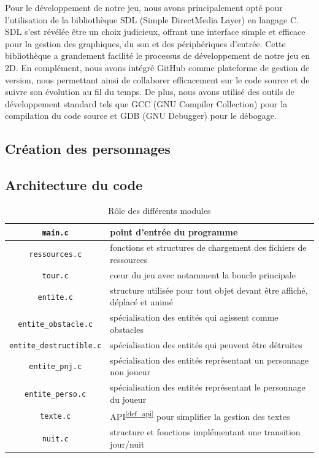\documentclass[a4paper,12pt]{article}
\newcommand\refsuscrite[1]{\textsuperscript{\ref{#1}}}
\begin{document}
Pour le développement de notre jeu, nous avons principalement opté pour l'utilisation de la bibliothèque SDL (Simple DirectMedia Layer) en langage C. SDL s'est révélée être un choix judicieux, offrant une interface simple et efficace pour la gestion des graphiques, du son et des périphériques d'entrée. Cette bibliothèque a grandement facilité le processus de développement de notre jeu en 2D. En complément, nous avons intégré GitHub comme plateforme de gestion de version, nous permettant ainsi de collaborer efficacement sur le code source et de suivre son évolution au fil du temps. De plus, nous avons utilisé des outils de développement standard tels que GCC (GNU Compiler Collection) pour la compilation du code source et GDB (GNU Debugger) pour le débogage.

\subsection{Création des personnages}



\subsection{Architecture du code}

\begin{table}[H]
    \centering
    \begin{tabular}{c p{}}
	\toprule
	\texttt{main.c}			    & point d’entrée du programme	\\
	\midrule
	\texttt{ressources.c}		    & fonctions et structures de chargement des fichiers de ressources	\\
	\midrule
	\texttt{tour.c}			    & cœur du jeu avec notamment la boucle principale	\\
	\midrule
	\texttt{entite.c}                   & structure utilisée pour tout objet devant être affiché, déplacé et animé  \\
	\midrule
	\texttt{entite\_obstacle.c}          & spécialisation des entités qui agissent comme obstacles  \\
	\midrule
	\texttt{entite\_destructible.c}	    & spécialisation des entités qui peuvent être détruites \\
	\midrule
	\texttt{entite\_pnj.c}		    & spécialisation des entités représentant un personnage non joueur	\\
	\midrule
	\texttt{entite\_perso.c}		    & spécialisation des entités représentant le personnage du joueur	\\
	\midrule
	\texttt{texte.c}		    & API\refsuscrite{def_api} pour simplifier la gestion des textes   \\
	\midrule
	\texttt{nuit.c}			    & structure et fonctions implémentant une transition jour/nuit \\
	\bottomrule
    \end{tabular}
    \caption{Rôle des différents modules}
\end{table}
\end{document}
